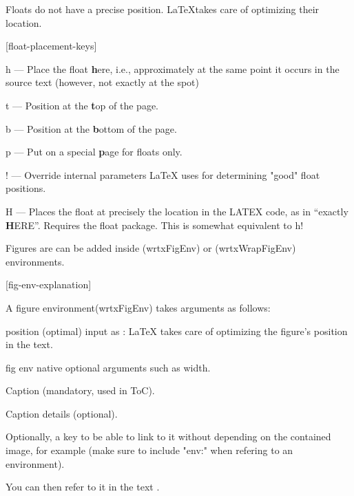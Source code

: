 Floats do not have a precise position. \LaTeX takes care of optimizing their location.

[float-placement-keys]

\begin{wrtxListMeta}
  \item[h] ---	Place the float \textbf{h}ere, i.e., approximately at the same point it occurs in the source text (however, not exactly at the spot)
  \item[t] ---	Position at the \textbf{t}op of the page.
  \item[b] --- Position at the \textbf{b}ottom of the page.
  \item[p] --- Put on a special \textbf{p}age for floats only.
  \item[!] --- Override internal parameters LaTeX uses for determining "good" float positions.
  \item[H] ---	Places the float at precisely the location in the LATEX code, as in ``exactly \textbf{H}ERE''. Requires the float package. This is somewhat equivalent to h!
\end{wrtxListMeta}




Figures are can be added inside  (wrtxFigEnv) or  (wrtxWrapFigEnv) environments.

[fig-env-explanation]

A figure environment(wrtxFigEnv) takes arguments as follows:
\begin{wrtxListItemize}
  \item position (optimal) input as : LaTeX takes care of optimizing the figure's position in the text.
  \item fig env native optional arguments such as width.
  \item Caption (mandatory, used in ToC).
  \item Caption details (optional).
  \item Optionally, a key to be able to link to it without depending on the contained image, for example  (make sure to include "env:" when refering to an environment).
\end{wrtxListItemize}

You can then refer to it in the text .



